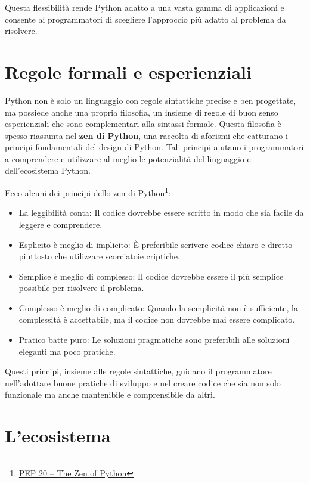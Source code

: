 \documentclass[
  letterpaper,
  DIV=11,
  numbers=noendperiod]{scrreprt}
\providecommand{\tightlist}{%
  \setlength{\itemsep}{0pt}\setlength{\parskip}{0pt}}\usepackage{longtable,booktabs,array}
\begin{document}
Questa flessibilità rende Python adatto a una vasta gamma di
applicazioni e consente ai programmatori di scegliere l'approccio più
adatto al problema da risolvere.

\section{Regole formali e
esperienziali}\label{regole-formali-e-esperienziali}

Python non è solo un linguaggio con regole sintattiche precise e ben
progettate, ma possiede anche una propria filosofia, un insieme di
regole di buon senso esperienziali che sono complementari alla sintassi
formale. Questa filosofia è spesso riassunta nel \textbf{zen di Python},
una raccolta di aforismi che catturano i principi fondamentali del
design di Python. Tali principi aiutano i programmatori a comprendere e
utilizzare al meglio le potenzialità del linguaggio e dell'ecosistema
Python.

Ecco alcuni dei principi dello zen di Python\footnote{\href{https://peps.python.org/pep-0020/}{PEP
  20 -- The Zen of Python}}:

\begin{itemize}
\tightlist
\item
  La leggibilità conta: Il codice dovrebbe essere scritto in modo che
  sia facile da leggere e comprendere.
\item
  Esplicito è meglio di implicito: È preferibile scrivere codice chiaro
  e diretto piuttosto che utilizzare scorciatoie criptiche.
\item
  Semplice è meglio di complesso: Il codice dovrebbe essere il più
  semplice possibile per risolvere il problema.
\item
  Complesso è meglio di complicato: Quando la semplicità non è
  sufficiente, la complessità è accettabile, ma il codice non dovrebbe
  mai essere complicato.
\item
  Pratico batte puro: Le soluzioni pragmatiche sono preferibili alle
  soluzioni eleganti ma poco pratiche.
\end{itemize}

Questi principi, insieme alle regole sintattiche, guidano il
programmatore nell'adottare buone pratiche di sviluppo e nel creare
codice che sia non solo funzionale ma anche mantenibile e comprensibile
da altri.

\section{L'ecosistema}\label{lecosistema}
\end{document}
